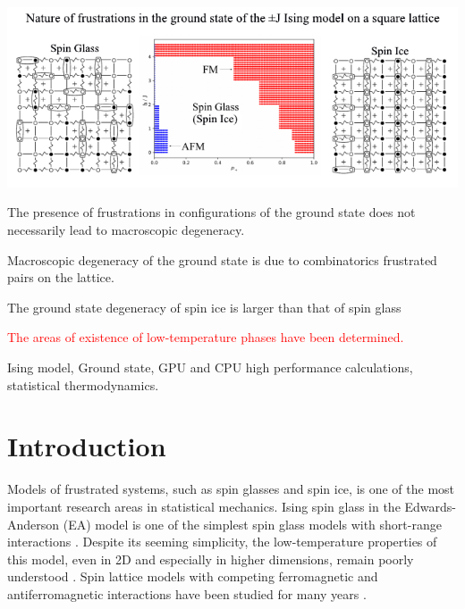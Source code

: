 \documentclass[preprint,12pt]{elsarticle}
\begin{document}
\begin{frontmatter}
\begin{abstract}
		\end{abstract}
		
		\begin{graphicalabstract}
		\includegraphics[width=1.2\linewidth]{Graphical Abstract.pdf}
		\end{graphicalabstract}
		
		
		\begin{highlights}  
			\item The presence of frustrations in configurations of the ground state does not necessarily lead to macroscopic degeneracy.
			\item Macroscopic degeneracy of the ground state is due to combinatorics frustrated pairs on the lattice.
			\item The ground state degeneracy of spin ice is larger than that of spin glass
			\item \textcolor{red}{The areas of existence of low-temperature phases have been determined.}
		\end{highlights}  
		
		
		\begin{keyword}
			Ising model, Ground state, GPU and CPU high performance calculations, statistical thermodynamics.
		\end{keyword}
		
		
	\end{frontmatter}
	
	\linenumbers
	
	\newpage
	\tableofcontents
	
	\newpage
	\section{Introduction}
	
	Models of frustrated systems, such as spin glasses and spin ice, is one of the most important research areas in statistical mechanics. Ising spin glass in the Edwards-Anderson (EA) model is one of the simplest spin glass models with short-range interactions \cite{edwards1975theory}. Despite its seeming simplicity, the low-temperature properties of this model, even in 2D and especially in higher dimensions, remain poorly understood \cite{pal1996ground, hartmann2011ground, newman2022ground}. Spin lattice models with competing ferromagnetic and antiferromagnetic interactions have been studied for many years \cite{binder1986spin, mezard1987spin, lebrecht2004plaquette, valdes2012j, lebrecht2015j, fan2023searching}.
	
\end{document}
